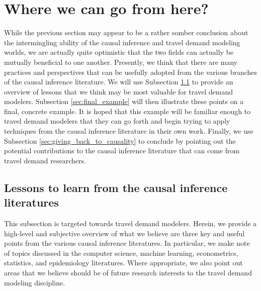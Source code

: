 \section{Where we can go from here?}
\label{sec:looking_towards_future}
While the previous section may appear to be a rather somber conclusion about the intermingling ability of the causal inference and travel demand modeling worlds, we are actually quite optimistic that the two fields can actually be mutually beneficial to one another. Presently, we think that there are many practices and perspectives that can be usefully adopted from the various branches of the causal inference literature. We will use Subsection \ref{sec:causal_lessons} to provide an overview of lessons that we think may be most valuable for travel demand modelers. Subsection \ref{sec:final_example} will then illustrate these points on a final, concrete example. It is hoped that this example will be familiar enough to travel demand modelers that they can go forth and begin trying to apply techniques from the causal inference literature in their own work. Finally, we use Subsection \ref{sec:giving_back_to_causality} to conclude by pointing out the potential contributions to the causal inference literature that can come from travel demand researchers.

\subsection{Lessons to learn from the causal inference literatures}
\label{sec:causal_lessons}
This subsection is targeted towards travel demand modelers. Herein, we provide a high-level and subjective overview of what we believe are three key and useful points from the various causal inference literatures. In particular, we make note of topics discussed in the computer science, machine learning, econometrics, statistics, and epidemiology literatures. Where appropriate, we also point out areas that we believe should be of future research interests to the travel demand modeling discipline.

